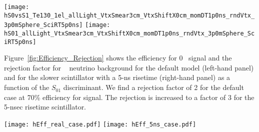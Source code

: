 \begin{figure*}[h]
  \centering
  \texttt{[image: hS0vsS1\_Te130\_1el\_allLight\_VtxSmear3cm\_VtxShiftX0cm\_momDT1p0ns\_rndVtx\_3p0mSphere\_SciRT5p0ns]} 
  \texttt{[image: hS01\_allLight\_VtxSmear3cm\_VtxShiftX0cm\_momDT1p0ns\_rndVtx\_3p0mSphere\_SciRT5p0ns]}
  \caption{The scintillation rise time constant is increased to
    $\tau_r=$5~ns compared to $\tau_r=$1~ns in the default detector
    model.  \emph{Left:} Scatter plot of $S_0$ versus $S_1$ for a
    simulation of 1000 signal (\emph{red crosses}) and background
    (\emph{blue triangles}) events. Event vertices are uniformly
    distributed within the fiducial volume, $R<3$~m.  Vertex is
    smeared with 3~cm resolution. Differential cut of $\Delta
    t=t^{phot}_{measured} - t^{phot}_{predicted}<$1~ns is applied to
    select early PE sample.  The default QE and 100\% photo-coverage
    is used in the simulation.  Black dashed line corresponds to a
    linear fit to define 1-D variable $S_{01}$ (see text for details).
    \emph{Right:} Comparison of the $S_{01}$ distribution between
    signal (\emph{red solid line}) and background (\emph{blue dashed
    line}).  $I_{overlap}$=0.64.}
\label{fig:SL_Te_SmearX3cm_momDT1ns_rndVtx_3p0m_SciRT5p0ns}
\end{figure*}

\clearpage

Figure~\ref{fig:Efficiency_Rejection} shows the
efficiency for 0\nbb~ signal and the rejection factor for \B~ neutrino
background for the default model (left-hand panel) 
and for the slower scintillator with
a 5-ns risetime (right-hand panel) as a function of the $S_{01}$
discriminant. We find a rejection factor of 2 for the default case at
70\% efficiency for signal. The rejection is increased to a factor of
3 for the 5-nsec risetime scintillator.

\begin{figure*}[h]
  \centering
  \texttt{[image: hEff\_real\_case.pdf]}
  \texttt{[image: hEff\_5ns\_case.pdf]}
  \caption{ The efficiency for 0\nbb~ signal (left-hand scale )and the
rejection factor for \B neutrino background (right-hand scale) versus
$S_{01}$ for: \emph{Left:} the default model; and \emph{Right:} a
liquid scintillator with a 5-nsec risetime.}
\label{fig:Efficiency_Rejection}
\end{figure*}







